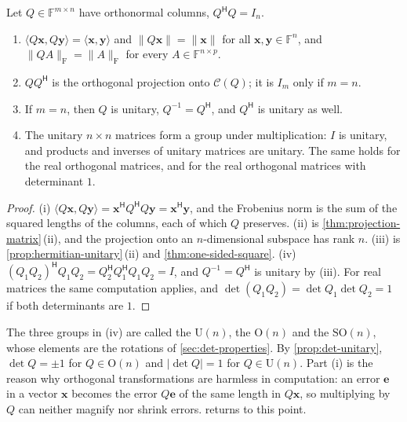 \begin{proposition}
\label{prop:orthonormal-columns}
Let $Q\in\mathbb F^{m\times n}$ have orthonormal columns, $Q^{\mathsf H}Q=I_n$.
\begin{enumerate}
\item $\langle Q\mathbf x,Q\mathbf y\rangle=\langle\mathbf x,\mathbf y\rangle$ and $\|Q\mathbf x\|=\|\mathbf x\|$ for all $\mathbf x,\mathbf y\in\mathbb F^n$, and $\|QA\|_{\mathrm F}=\|A\|_{\mathrm F}$ for every $A\in\mathbb F^{n\times p}$.
\item $QQ^{\mathsf H}$ is the orthogonal projection onto $\mathcal C(Q)$; it is $I_m$ only if $m=n$.
\item If $m=n$, then $Q$ is unitary, $Q^{-1}=Q^{\mathsf H}$, and $Q^{\mathsf H}$ is unitary as well.
\item The unitary $n\times n$ matrices form a group under multiplication: $I$ is unitary, and products and inverses of unitary matrices are unitary. The same holds for the real orthogonal matrices, and for the real orthogonal matrices with determinant $1$.
\end{enumerate}
\end{proposition}

\begin{proof}
(i) $\langle Q\mathbf x,Q\mathbf y\rangle=\mathbf x^{\mathsf H}Q^{\mathsf H}Q\mathbf y=\mathbf x^{\mathsf H}\mathbf y$, and the Frobenius norm is the sum of the squared lengths of the columns, each of which $Q$ preserves. (ii) is \cref{thm:projection-matrix}\,(ii), and the projection onto an $n$-dimensional subspace has rank $n$. (iii) is \cref{prop:hermitian-unitary}\,(ii) and \cref{thm:one-sided-square}. (iv) $(Q_1Q_2)^{\mathsf H}Q_1Q_2=Q_2^{\mathsf H}Q_1^{\mathsf H}Q_1Q_2=I$, and $Q^{-1}=Q^{\mathsf H}$ is unitary by (iii). For real matrices the same computation applies, and $\det(Q_1Q_2)=\det Q_1\det Q_2=1$ if both determinants are $1$.
\end{proof}

The three groups in (iv) are called the  $\mathrm U(n)$, the  $\mathrm O(n)$ and the  $\mathrm{SO}(n)$, whose elements are the rotations of \cref{sec:det-properties}. By \cref{prop:det-unitary}, $\det Q=\pm1$ for $Q\in\mathrm O(n)$ and $|\det Q|=1$ for $Q\in\mathrm U(n)$. Part (i) is the reason why orthogonal transformations are harmless in computation: an error $\mathbf e$ in a vector $\mathbf x$ becomes the error $Q\mathbf e$ of the same length in $Q\mathbf x$, so multiplying by $Q$ can neither magnify nor shrink errors.  returns to this point.

